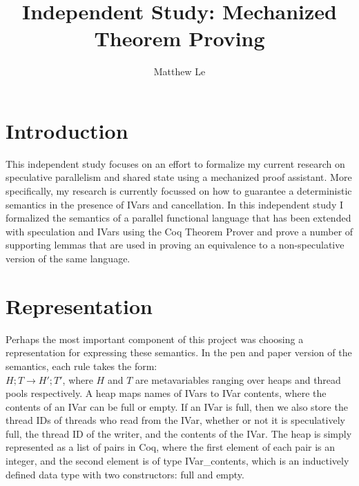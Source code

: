\documentclass[11pt]{article}
\title{Independent Study: Mechanized Theorem Proving}
\author{Matthew Le}
\begin{document}
\maketitle

\section{Introduction}

This independent study focuses on an effort to formalize my current research on speculative parallelism and shared state using a mechanized proof assistant.  More specifically, my research is currently focussed on how to guarantee a deterministic semantics in the presence of IVars \cite{i-structures} and cancellation.  In this independent study I formalized the semantics of a parallel functional language that has been extended with speculation and IVars using the Coq Theorem Prover and prove a number of supporting lemmas that are used in proving an equivalence to a non-speculative version of the same language.  

\section{Representation}
Perhaps the most important component of this project was choosing a representation for expressing these semantics.  In the pen and paper version of the semantics, each rule takes the form: \\$H; T \rightarrow H'; T'$, where $H$ and $T$ are metavariables ranging over heaps and thread pools respectively.  A heap maps names of IVars to IVar contents, where the contents of an IVar can be full or empty.  If an IVar is full, then we also store the thread IDs of threads who read from the IVar, whether or not it is speculatively full, the thread ID of the writer, and the contents of the IVar.  The heap is simply represented as a list of pairs in Coq, where the first element of each pair is an integer, and the second element is of type IVar\_contents, which is an inductively defined data type with two constructors: full and empty. 
\end{document}

